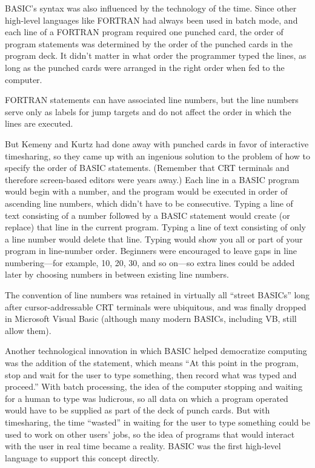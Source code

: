 

BASIC's syntax was also influenced by the technology of the time.  
Since other high-level languages like FORTRAN had always been used in
batch mode, and each line of a FORTRAN program 
required one punched card, the order of program statements was
determined by the order of the punched cards in the program deck.
It
didn't matter in what order the programmer typed the lines, as long as
the punched cards were arranged in the right order when fed to the computer.
\begin{sidebar}{}
FORTRAN statements can have associated line numbers, but the line
numbers serve only as labels for jump targets and do not affect the
order in which the lines are executed.
\end{sidebar}
But 
Kemeny and Kurtz had done away with punched cards in favor of
interactive timesharing, so they
came up with an ingenious solution to the problem of
how to specify the order of BASIC statements.  (Remember that CRT
terminals and therefore screen-based editors were years away.)
Each line in a BASIC
program would begin with a number, and the program would be
executed in order of ascending line numbers, which didn't have to be
consecutive.  
Typing a line of text consisting of a number followed by a BASIC statement
would create (or replace) that line in the current program.
Typing a line of text consisting of only a line number would delete that line.
Typing  would show
you all or part of your program in line-number order.
Beginners were encouraged to leave gaps in line
numbering---for example, 10, 20, 30, and so on---so 
extra lines could be added later by choosing numbers in between
existing line numbers.

  \begin{tangent}
  The convention of line numbers was retained in virtually all ``street
  BASICs'' long after cursor-addressable CRT terminals were ubiquitous,
  and was finally dropped in Microsoft Visual Basic (although many modern
  BASICs, including VB, still allow them).
  \end{tangent}

Another technological innovation in which BASIC helped democratize
computing was the addition of the 
statement, which means ``At this point in the program, stop and wait for
the user to type something, then record what was typed and proceed.''
With batch processing, the
idea of the computer stopping and waiting for a human to type was
ludicrous, so all data on which a program operated would have to be
supplied as part of the deck of punch cards.
But with timesharing, the time ``wasted'' in waiting for the user to
type something could be used to work on other users' jobs, so
the idea of programs that would interact with the
user in real time became a reality.  BASIC was the first high-level language to
support this concept directly.

